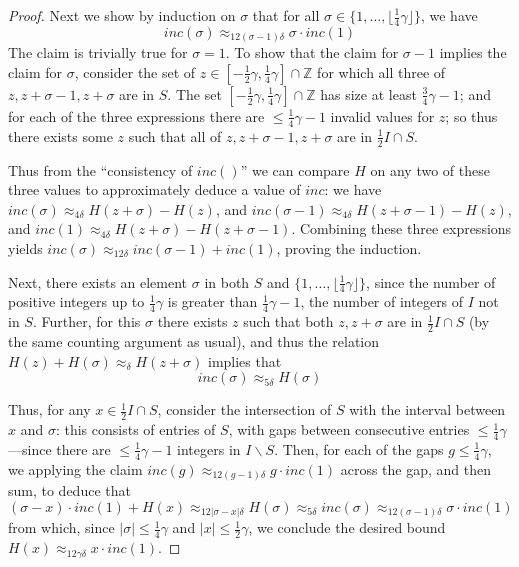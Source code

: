 \documentclass[11pt]{article}
\theoremstyle{plain}
\begin{document}
\begin{proof}
Next we show by induction on $\sigma$ that for all $\sigma\in \{1,\ldots,\lfloor\frac{1}{4}\gamma\rfloor\}$, we have \[inc(\sigma)\approx_{12(\sigma-1)\delta} \sigma\cdot inc(1)\] The claim is trivially true for $\sigma=1$. To show that the claim for $\sigma-1$ implies the claim for $\sigma$, consider the set of $z\in [-\frac{1}{2}\gamma,\frac{1}{4}\gamma]\cap\mathbb{Z}$ for which all three of $z,z+\sigma-1,z+\sigma$ are in $S$. The set $[-\frac{1}{2}\gamma,\frac{1}{4}\gamma]\cap\mathbb{Z}$ has size at least $\frac{3}{4}\gamma-1$; and for each of the three expressions there are $\leq\frac{1}{4}\gamma-1$ invalid values for $z$; so thus there exists some $z$ such that all of $z,z+\sigma-1,z+\sigma$ are in $\frac{1}{2}I\cap S$.

Thus from the ``consistency of $inc()$'' we can compare $H$ on any two of these three values to approximately deduce a value of $inc$: we have $inc(\sigma)\approx_{4\delta} H(z+\sigma)-H(z)$, and $inc(\sigma-1)\approx_{4\delta} H(z+\sigma-1)-H(z)$, and $inc(1)\approx_{4\delta} H(z+\sigma)-H(z+\sigma-1)$. Combining these three expressions yields $inc(\sigma)\approx_{12\delta} inc(\sigma-1)+inc(1)$, proving the induction.

Next, there exists an element $\sigma$ in both $S$ and $\{1,\ldots,\lfloor\frac{1}{4}\gamma\rfloor\}$, since the number of positive integers up to $\frac{1}{4}\gamma$ is greater than $\frac{1}{4}\gamma-1$, the number of integers of $I$ not in $S$. Further, for this $\sigma$ there exists $z$ such that both $z,z+\sigma$ are in $\frac{1}{2}I\cap S$ (by the same counting argument as usual), and thus the relation $H(z)+H(\sigma)\approx_{\delta} H(z+\sigma)$ implies that \[inc(\sigma)\approx_{5\delta} H(\sigma)\]

Thus, for any $x\in \frac{1}{2}I\cap S$, consider the intersection of $S$ with the interval between $x$ and $\sigma$: this consists of entries of $S$, with gaps between consecutive entries $\leq \frac{1}{4}\gamma$---since there are $\leq\frac{1}{4}\gamma-1$ integers in $I\backslash S$. Then, for each of the gaps $g\leq  \frac{1}{4}\gamma$, we applying the claim $inc(g)\approx_{12(g-1)\delta} g\cdot inc(1)$ across the gap, and then sum, to deduce that \[(\sigma-x)\cdot inc(1)+H(x)\approx_{12|\sigma-x|\delta} H(\sigma) \approx_{5\delta} inc(\sigma)\approx_{12(\sigma-1)\delta} \sigma\cdot inc(1)\] from which, since $|\sigma|\leq \frac{1}{4}\gamma$ and $|x|\leq\frac{1}{2}\gamma$,  we conclude the desired bound $H(x)\approx_{12\gamma\delta} x\cdot inc(1)$.
\end{proof}
\end{document}
